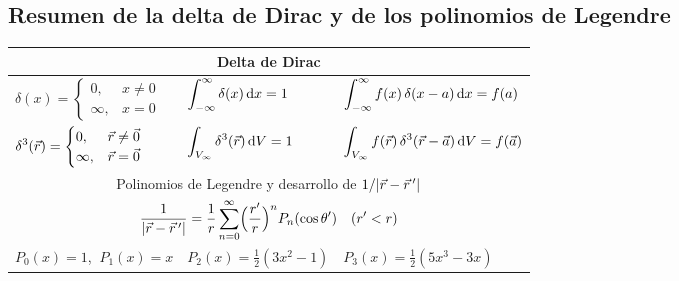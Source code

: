 \subsection{Resumen de la delta de Dirac y de los polinomios de Legendre}\label{sec:resumen-delta}
\begin{center}
\renewcommand{\arraystretch}{1.5}
\small
\begin{tabular}{@{}lll@{}}
\toprule
\multicolumn{3}{c}{Delta de Dirac}\\
\midrule
$\displaystyle\delta(x)=\begin{cases}0,&x\neq0\\ \infty,&x=0\end{cases}$ &
$\displaystyle\int_{-\infty}^{\infty}\delta(x)\,\mathrm{d} x=1$ &
$\displaystyle\int_{-\infty}^{\infty}f(x)\,\delta(x-a)\,\mathrm{d} x=f(a)$\\
$\displaystyle\delta^{3}(\vec{r})=\begin{cases}0,&\vec{r}\neq\vec{0}\\ \infty,&\vec{r}=\vec{0}\end{cases}$ &
$\displaystyle\int_{V_\infty}\delta^{3}(\vec{r})\,\mathrm{d} V=1$ &
$\displaystyle\int_{V_\infty}f(\vec{r})\,\delta^{3}(\vec{r}-\vec{a})\,\mathrm{d} V=f(\vec{a})$\\
\midrule
\multicolumn{3}{c}{Polinomios de Legendre y desarrollo de $1/\lvert \vec{r}-\vec{r}\,'\rvert$}\\
\midrule
\multicolumn{3}{c}{$\displaystyle\frac{1}{\lvert \vec{r}-\vec{r}\,'\rvert}=\frac{1}{r}\sum_{n=0}^{\infty}\Bigl(\frac{r'}{r}\Bigr)^{n}P_n(\cos\theta')\quad(r'<r)$}\\
$P_0(x)=1$, $\ P_1(x)=x$ & $P_2(x)=\tfrac12(3x^{2}-1)$ & $P_3(x)=\tfrac12(5x^{3}-3x)$\\
\bottomrule
\end{tabular}
\end{center}
